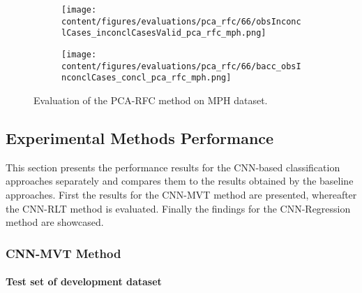 \begin{figure}[ht]
  \begin{subfigure}{0.49\textwidth}
    \centering
    \texttt{[image: content/figures/evaluations/pca\_rfc/66/obsInconclCases\_inconclCasesValid\_pca\_rfc\_mph.png]}
    \label{fig:obsInconclCases_inconclCasesValid_pca_rfc_mph}
  \end{subfigure}
  \hfill
  \begin{subfigure}{0.49\textwidth}
    \centering
    \texttt{[image: content/figures/evaluations/pca\_rfc/66/bacc\_obsInconclCases\_concl\_pca\_rfc\_mph.png]}
    \label{fig:bacc_obsInconclCases_concl_pca_rfc_mph}
  \end{subfigure}
  \caption{Evaluation of the PCA-RFC method on MPH dataset.}
  \label{fig:perf_results_rfc_mph}
\end{figure}


\subsection{Experimental Methods Performance}
\label{subsec:exp_methods_perf}

This section presents the performance results for the CNN-based classification approaches separately and compares them 
to the results obtained by the baseline approaches.
First the results for the CNN-MVT method are presented, whereafter the CNN-RLT method is evaluated.
Finally the findings for the CNN-Regression method are showcased.

\subsubsection{CNN-MVT Method}
\label{subsubsec:eval_mvt}


\paragraph{Test set of development dataset}


